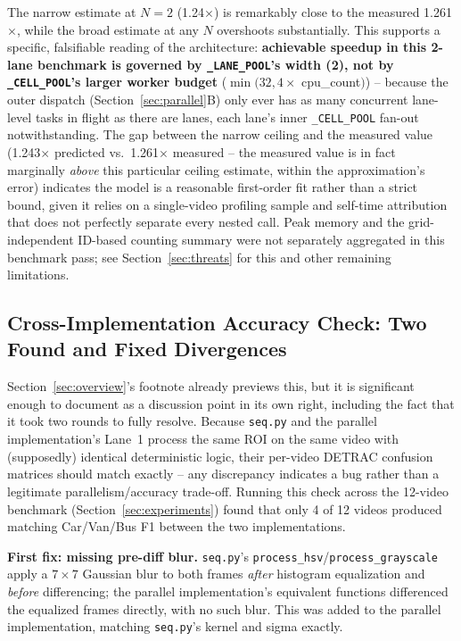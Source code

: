 \documentclass[conference]{IEEEtran}
\newcommand{\code}[1]{\texttt{#1}}
\begin{document}
The narrow estimate at $N{=}2$ (1.24$\times$) is remarkably close to the
measured 1.261$\times$, while the broad estimate at any $N$ overshoots
substantially. This supports a specific, falsifiable reading of the
architecture: \textbf{achievable speedup in this 2-lane benchmark is
governed by \code{\_LANE\_POOL}'s width (2), not by
\code{\_CELL\_POOL}'s larger worker budget} ($\min(32, 4\times$
cpu\_count$)$) -- because the outer dispatch (Section~\ref{sec:parallel}B)
only ever has as many concurrent lane-level tasks in flight as there are
lanes, each lane's inner \code{\_CELL\_POOL} fan-out notwithstanding.
The gap between the narrow ceiling and the measured value (1.243$\times$
predicted vs.\ 1.261$\times$ measured -- the measured value is in fact
marginally \emph{above} this particular ceiling estimate, within the
approximation's error) indicates the model is a reasonable
first-order fit rather than a strict bound, given it relies on a
single-video profiling sample and self-time attribution that does not
perfectly separate every nested call. Peak memory and the
grid-independent ID-based counting summary were not separately
aggregated in this benchmark pass; see Section~\ref{sec:threats} for
this and other remaining limitations.

\subsection{Cross-Implementation Accuracy Check: Two Found and Fixed Divergences}
Section~\ref{sec:overview}'s footnote already previews this, but it is
significant enough to document as a discussion point in its own right,
including the fact that it took two rounds to fully resolve. Because
\code{seq.py} and the parallel implementation's Lane~1 process the same
ROI on the same video with (supposedly) identical deterministic logic,
their per-video DETRAC confusion matrices should match exactly -- any
discrepancy indicates a bug rather than a legitimate
parallelism/accuracy trade-off. Running this check across the 12-video
benchmark (Section~\ref{sec:experiments}) found that only 4 of 12 videos
produced matching Car/Van/Bus F1 between the two implementations.

\textbf{First fix: missing pre-diff blur.} \code{seq.py}'s
\code{process\_hsv}/\code{process\_grayscale} apply a $7\times7$
Gaussian blur to both frames \emph{after} histogram equalization and
\emph{before} differencing; the parallel implementation's equivalent
functions differenced the equalized frames directly, with no such blur.
This was added to the parallel implementation, matching \code{seq.py}'s
kernel and sigma exactly.
\end{document}
